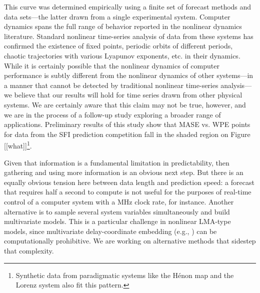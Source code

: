 This curve was determined empirically using a finite set of forecast
methods and data sets---the latter drawn from a single experimental
system.  Computer dynamics spans the full range of behavior reported
in the nonlinear dynamics literature.  Standard nonlinear time-series
analysis of data from these systems has confirmed the existence of
fixed points, periodic orbits of different periods, chaotic
trajectories with various Lyapunov exponents, etc. in their dynamics.
While it is certainly possible that the nonlinear dynamics of computer
performance is subtly different from the nonlinear dynamics of other
systems---in a manner that cannot be detected by traditional nonlinear
time-series analysis---we believe that our results will hold for time
series drawn from other physical systems.  We are certainly aware that
this claim may not be true, however, and we are in the process of a
follow-up study exploring a broader range of applications.
Preliminary results of this study show that MASE vs. WPE points for
data from the SFI prediction competition \cite{weigend-book} fall in
the shaded region on Figure [[what]]\footnote{Synthetic data from
  paradigmatic systems like the H\'{e}non map \cite{henon} and the
  Lorenz system \cite{lorenz} also fit this pattern.}.

Given that information is a fundamental limitation in predictability,
then gathering and using more information is an obvious next step.
But there is an equally obvious tension here between data length and
prediction speed: a forecast that requires half a second to compute is
not useful for the purposes of real-time control of a computer system
with a MHz clock rate, for instance.  Another alternative is to sample
several system variables simultaneously and build multivariate models.
This is a particular challenge in nonlinear LMA-type models, since
multivariate delay-coordinate embedding (e.g.,
\cite{cao-multivariate-embedding,deyle-sugihara2011}) can be
computationally prohibitive.  We are working on alternative methods
that sidestep that complexity.


